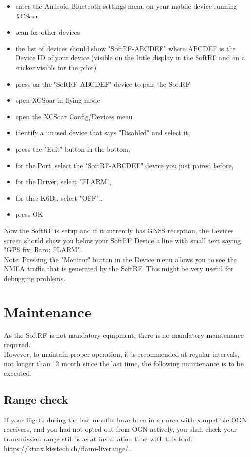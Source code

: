 \documentclass[11pt,a4paper]{article}
\begin{document}
\begin{itemize}
\item enter the Android Bluetooth settings menu on your mobile device running XCSoar
\item scan for other devices
\item the list of devices should show "SoftRF-ABCDEF" where ABCDEF is the Device ID of your device (visible on the little display in the SoftRF and on a sticker visible for the pilot)
\item press on the "SoftRF-ABCDEF" device to pair the SoftRF
\item open XCSoar in flying mode
\item open the XCSoar Config/Devices menu
\item identify a unused device that says "Disabled" and select it, 
\item press the "Edit" button in the bottom,
\item for the Port, select the "SoftRF-ABCDEF" device you just paired before,
\item for the Driver, select "FLARM",
\item for thee K6Bt, select "OFF",,
\item press OK
\end{itemize}

Now the SoftRF is setup and if it currently has GNSS reception, the Devices screen should show you below your SoftRF Device a line with small text saying "GPS fix; Baro; FLARM".\\

Note: Pressing the "Monitor" button in the Device menu allows you to see the NMEA traffic that is generated by the SoftRF. This might be very useful for debugging problems.

\section{Maintenance}
As the SoftRF is not mandatory equipment, there is no mandatory maintenance required.\\

However, to maintain proper operation, it is recommended at regular intervals, not longer than 12 month since the last time, the following maintenance is to be executed.

\subsection{Range check}
If your flights during the last months have been in an area with compatible OGN receivers, and you had not opted out from OGN actively, you shall check your transmission range still is as at installation time with this tool: https://ktrax.kisstech.ch/flarm-liverange/.
\end{document}
